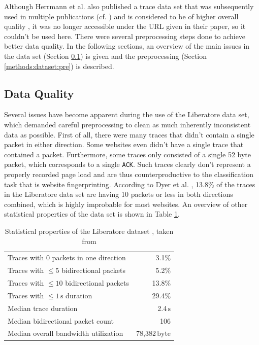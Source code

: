 \documentclass[
	ruledheaders=chapter,
	class=report,
	thesis={type=master, department=inf},
	accentcolor=1c,
	custommargins=true,
	marginpar=false,
	parskip=half-,
	fontsize=11pt,
]{tudapub}
\begin{document}
	Although Herrmann et al. \cite{Herrmann2009} also published a trace data set that was subsequently used in multiple publications (cf. \cite{Panchenko2011,Dyer2012}) and is considered to be of higher overall quality \cite{Dyer2012}, it was no longer accessible under the URL given in their paper, so it couldn't be used here. There were several preprocessing steps done to achieve better data quality. In the following sections, an overview of the main issues in the data set (Section \ref{methods:dataset:quality}) is given and the preprocessing (Section \ref{methods:dataset:pre}) is described.
	
	\subsection{Data Quality}
	\label{methods:dataset:quality}
	
	Several issues have become apparent during the use of the Liberatore data set, which demanded careful preprocessing to clean as much inherently inconsistent data as possible. First of all, there were many traces that didn't contain a single packet in either direction. Some websites even didn't have a single trace that contained a packet. Furthermore, some traces only consisted of a single 52 byte packet, which corresponds to a single \texttt{ACK}. Such traces clearly don't represent a properly recorded page load and are thus counterproductive to the classification task that is website fingerprinting. According to Dyer et al. \cite{Dyer2012}, 13.8\% of the traces in the Liberatore data set are having 10 packets or less in both directions combined, which is highly improbable for most websites. An overview of other statistical properties of the data set is shown in Table \ref{tbl:dataset_props}.
	
	\begin{table}
		\centering
		\begin{tabularx}{0.7\textwidth}{Xr}
			\toprule Traces with 0 packets in one direction & 3.1\% \\
			Traces with $\leq 5$ bidirectional packets & 5.2\% \\
			Traces with $\leq 10$ bidirectional packets & 13.8\% \\
			Traces with $\leq 1\,\text{s}$ duration & 29.4\% \\
			Median trace duration & 2.4$\,\text{s}$ \\
			Median bidirectional packet count & 106 \\
			Median overall bandwidth utilization & 78,382$\,\text{byte}$ \\
			\bottomrule
		\end{tabularx}
		\caption{Statistical properties of the Liberatore dataset \cite{Liberatore2006}, taken from \cite{Dyer2012}}
		\label{tbl:dataset_props}
	\end{table} 
	
\end{document}
